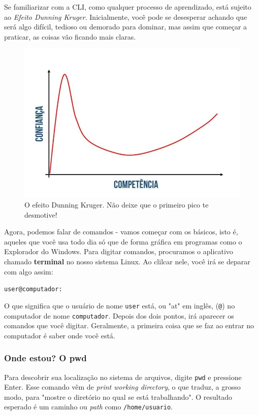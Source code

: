 \documentclass{article}
\begin{document}
	Se familiarizar com a CLI, como qualquer processo de aprendizado, está sujeito ao \textit{Efeito Dunning Kruger}. 
	Inicialmente, você pode se desesperar achando que será algo difícil, tedioso ou demorado para dominar, mas assim que
	começar a praticar, as coisas vão ficando mais claras. 

	\begin{figure}[ht!]
  		\centering
		\includegraphics[scale=0.3]{figs/dk.jpeg} 
  		\caption*{O efeito Dunning Kruger. Não deixe que o primeiro pico te desmotive!}
	\end{figure}
	
	Agora, podemos falar de comandos - vamos começar com os básicos, isto é, aqueles que você usa todo dia só que de forma gráfica
	em programas como o Explorador do Windows. Para digitar comandos, procuramos o aplicativo chamado \textbf{terminal} no 
	nosso sistema Linux. Ao clilcar nele, você irá se deparar com algo assim: 
	
	\vspace{1ex}
	\texttt{user@computador: ~}
	\vspace{1ex}

	O que significa que o usuário de nome \texttt{user} está, ou "at" em inglês, (\texttt{@}) no computador de nome
	\texttt{computador}. Depois dos dois pontos, irá aparecer os comandos que você digitar. Geralmente, a primeira coisa
	que se faz ao entrar no computador é saber onde você está. 
	
	\subsubsection{Onde estou? O pwd}
	Para descobrir sua localização no sistema de arquivos, digite \texttt{pwd} e pressione Enter. Esse comando vêm de 
	\textit{print working directory}, o que traduz, a grosso modo, para "mostre o diretório no qual se está trabalhando". O
	resultado esperado é um caminho ou \textit{path} como \texttt{/home/usuario}. 
\end{document}
